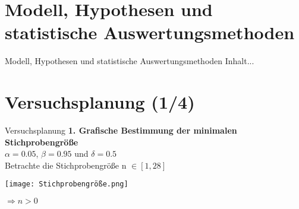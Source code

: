 \documentclass[ ngerman, fontsize= 10pt, headings=big, titlepage=true]{beamer}
\begin{document}
\section{Modell, Hypothesen und statistische Auswertungsmethoden}
\begin{frame}{Modell, Hypothesen und statistische Auswertungsmethoden}
	Inhalt...
\end{frame}

\section{Versuchsplanung (1/4)}
\begin{frame}{Versuchsplanung}
	\textbf{1. Grafische Bestimmung der minimalen Stichprobengröße}\\
	$\alpha =0.05$, $\beta = 0.95$ und $\delta =0.5$\\
	 Betrachte die Stichprobengröße n $\in [1,28]$
	 
	\begin{center}
		\texttt{[image: Stichprobengröße.png]}
	\end{center}

	$\Rightarrow n > 0$
\end{frame}
\end{document}
